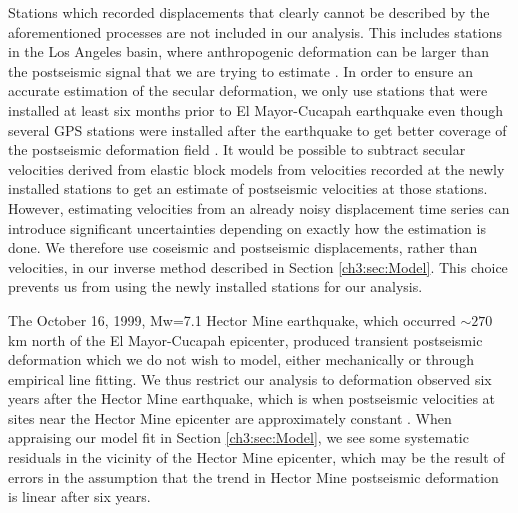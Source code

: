 Stations which recorded displacements that clearly cannot be described
by the aforementioned processes are not included in our analysis. This
includes stations in the Los Angeles basin, where anthropogenic
deformation can be larger than the postseismic signal that we are
trying to estimate \citep{Bawden2001,Argus2005}. In order to ensure an
accurate estimation of the secular deformation, we only use stations
that were installed at least six months prior to El Mayor-Cucapah
earthquake even though several GPS stations were installed after the
earthquake to get better coverage of the postseismic deformation field
\citep{Spinler2015}.  It would be possible to subtract secular
velocities derived from elastic block models
\citep[e.g.,][]{Meade2005} from velocities recorded at the newly
installed stations to get an estimate of postseismic velocities at
those stations. However, estimating velocities from an already noisy
displacement time series can introduce significant uncertainties
depending on exactly how the estimation is done.  We therefore use
coseismic and postseismic displacements, rather than velocities, in
our inverse method described in Section \ref{ch3:sec:Model}. This
choice prevents us from using the newly installed stations for our
analysis.

The October 16, 1999, Mw=7.1 Hector Mine earthquake, which occurred
${\sim}270$ km north of the El Mayor-Cucapah epicenter, produced
transient postseismic deformation which we do not wish to model,
either mechanically or through empirical line fitting.  We thus
restrict our analysis to deformation observed six years after the
Hector Mine earthquake, which is when postseismic velocities at sites
near the Hector Mine epicenter are approximately constant
\citep{Savage2009}. When appraising our model fit in Section
\ref{ch3:sec:Model}, we see some systematic residuals in the vicinity
of the Hector Mine epicenter, which may be the result of errors in the
assumption that the trend in Hector Mine postseismic deformation is
linear after six years.


